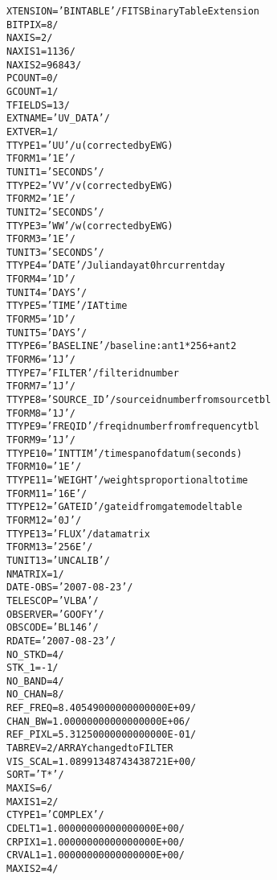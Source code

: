\documentclass[twoside]{article}
\newcommand{\Ex}[1]{\textcolor{excol}{#1}}
\begin{document}
\begin{alltt}
XTENSION= 'BINTABLE'           / FITS Binary Table Extension
BITPIX  =                    8 /
NAXIS   =                    2 /
NAXIS1  =                 1136 /
NAXIS2  =                96843 /
PCOUNT  =                    0 /
GCOUNT  =                    1 /
TFIELDS =                   13 /
EXTNAME = 'UV_DATA '           /
EXTVER  =                    1 /
\Ex{TTYPE1  = 'UU      '           / u (corrected by EWG)}
TFORM1  = '1E      '           /
TUNIT1  = 'SECONDS '           /
\Ex{TTYPE2  = 'VV      '           / v (corrected by EWG)}
TFORM2  = '1E      '           /
TUNIT2  = 'SECONDS '           /
\Ex{TTYPE3  = 'WW      '           / w (corrected by EWG)}
TFORM3  = '1E      '           /
TUNIT3  = 'SECONDS '           /
TTYPE4  = 'DATE    '           / Julian day at 0 hr current day
TFORM4  = '1D      '           /
TUNIT4  = 'DAYS    '           /
TTYPE5  = 'TIME    '           / IAT time
TFORM5  = '1D      '           /
TUNIT5  = 'DAYS    '           /
TTYPE6  = 'BASELINE'           / baseline: ant1*256 + ant2
TFORM6  = '1J      '           /
TTYPE7  = 'FILTER  '           / filter id number
TFORM7  = '1J      '           /
\Ex{TTYPE8  = 'SOURCE_ID'          / source id number from source tbl}
TFORM8  = '1J      '           /
TTYPE9  = 'FREQID  '           / freq id number from frequency tbl
TFORM9  = '1J      '           /
TTYPE10 = 'INTTIM  '           / time span of datum (seconds)
TFORM10 = '1E      '           /
TTYPE11 = 'WEIGHT  '           / weights proportional to time
TFORM11 = '16E     '           /
TTYPE12 = 'GATEID  '           / gate id from gate model table
TFORM12 = '0J      '           /
TTYPE13 = 'FLUX    '           / data matrix
TFORM13 = '256E    '           /
TUNIT13 = 'UNCALIB '           /
NMATRIX =                    1 /
DATE-OBS= '2007-08-23'         /
TELESCOP= 'VLBA    '           /
OBSERVER= 'GOOFY   '           /
OBSCODE = 'BL146   '           /
RDATE   = '2007-08-23'         /
NO_STKD =                    4 /
STK_1   =                   -1 /
NO_BAND =                    4 /
NO_CHAN =                    8 /
REF_FREQ=   8.40549000000000000E+09 /
CHAN_BW =   1.00000000000000000E+06 /
REF_PIXL=   5.31250000000000000E-01 /
TABREV  =                    2 / ARRAY changed to FILTER
VIS_SCAL=   1.08991348743438721E+00 /
SORT    = 'T*      '           /
MAXIS   =                    6 /
MAXIS1  =                    2 /
CTYPE1  = 'COMPLEX '           /
CDELT1  =   1.00000000000000000E+00 /
CRPIX1  =   1.00000000000000000E+00 /
CRVAL1  =   1.00000000000000000E+00 /
MAXIS2  =                    4 /

\end{alltt}
\end{document}
